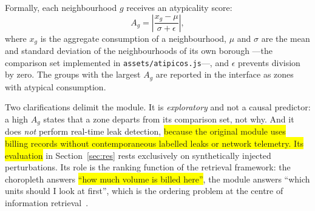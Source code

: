 \documentclass[runningheads]{llncs}
\newif\ifmarcarcambios
\newcommand{\icokg}[1]{\ifmarcarcambios\textcolor{nuevo}{#1}\else#1\fi}
\newenvironment{icokgblock}{\ifmarcarcambios\color{nuevo}\fi}{}
\newcommand{\nuevo}[1]{\colorbox{yellow}{#1}}
\renewcommand{\_}{\origunderscore\allowbreak}
\begin{document}
Formally, each neighbourhood $g$ receives an atypicality score:
\begingroup
\setlength{\abovedisplayskip}{3pt}
\setlength{\belowdisplayskip}{3pt}
\setlength{\abovedisplayshortskip}{0pt}
\setlength{\belowdisplayshortskip}{3pt}
\begin{equation}
A_g = \left| \frac{x_g - \mu}{\sigma + \epsilon} \right|,
\end{equation}
\endgroup
where $x_g$ is the aggregate consumption of a neighbourhood, \icokg{$\mu$ and $\sigma$ are the mean and standard deviation of the neighbourhoods of its own borough ---the comparison set implemented in \texttt{assets/atipicos.js}---}, and $\epsilon$ prevents division by zero. The groups with the largest $A_g$ are reported in the interface as zones with atypical consumption.

\begin{icokgblock}
Two clarifications delimit the module. It is \emph{exploratory} and not a causal
predictor: a high $A_g$ states that a zone departs from its comparison set, not
why. And it does \emph{not} perform real-time leak detection, \nuevo{because the original module uses billing records without contemporaneous labelled leaks or network telemetry. Its evaluation} in Section~\ref{sec:res} rests exclusively on synthetically
injected perturbations. Its role is the ranking function of the retrieval
framework: the choropleth answers \nuevo{``how much volume is billed here''}, the module
answers ``which units should I look at first'', which is the ordering problem at
the centre of information retrieval~\cite{purves2018}.
\end{icokgblock}
\end{document}
